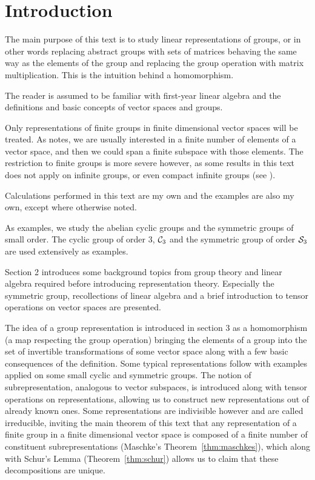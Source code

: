\clearpage{\thispagestyle{empty}}
\section{Introduction}

	The main purpose of this text is to study linear representations of groups, or in other words replacing abstract groups with sets of matrices behaving the same way as the elements of the group and replacing the group operation with matrix multiplication. This is the intuition behind a homomorphism.
	
	The reader is assumed to be familiar with first-year linear algebra and the definitions and basic concepts of vector spaces and groups.
	
	Only representations of finite groups in finite dimensional vector spaces will be treated. As \cite[Sect.1.1.]{Serre} notes, we are usually interested in a finite number of elements of a vector space, and then we could span a finite subspace with those elements. The restriction to finite groups is more severe however, as some results in this text does not apply on infinite groups, or even compact infinite groups (see \cite{FultonHarris, Serre}). 
	
	Calculations performed in this text are my own and the examples are also my own, except where otherwise noted.
	
	As examples, we study the abelian cyclic groups and the symmetric groups of small order. The cyclic group of order 3, $\mathcal{C}_3$ and the symmetric group of order $\mathcal{S}_3$ are used extensively as examples.
	
	Section 2 introduces some background topics from group theory and linear algebra required before introducing representation theory. Especially the symmetric group, recollections of linear algebra and a brief introduction to tensor operations on vector spaces are presented.
	
	The idea of a group representation is introduced in section 3 as a homomorphism (a map respecting the group operation) bringing the elements of a group into the set of invertible transformations of some vector space along with a few basic consequences of the definition. Some typical representations follow with examples applied on some small cyclic and symmetric groups. The notion of subrepresentation, analogous to vector subspaces, is introduced along with tensor operations on representations, allowing us to construct new representations out of already known ones. Some representations are indivisible however and are called irreducible, inviting the main theorem of this text that any representation of a finite group in a finite dimensional vector space is composed of a finite number of constituent subrepresentations (Maschke's Theorem~\ref{thm:maschkes}), which along with Schur's Lemma (Theorem~\ref{thm:schur})  allows us to claim that these decompositions are unique.
	
